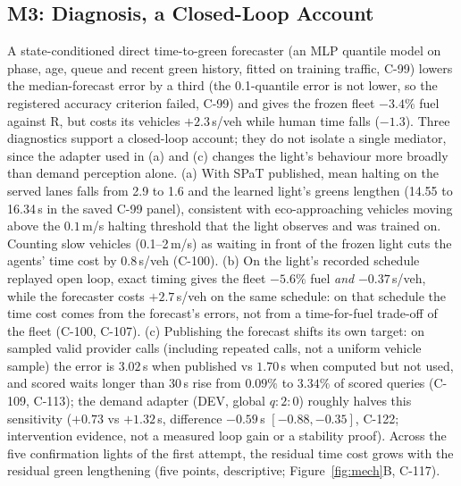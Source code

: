 \subsection{M3: Diagnosis, a Closed-Loop Account}\label{sec:diag}
A state-conditioned direct time-to-green forecaster (an MLP quantile model on phase, age, queue and recent green history, fitted on training
traffic, C-99) lowers the median-forecast error by a third (the 0.1-quantile error is not lower, so the
registered accuracy criterion failed, C-99) and gives the frozen fleet $-3.4\%$ fuel against R, but costs its vehicles
$+2.3$\,s/veh while human time falls ($-1.3$). Three diagnostics support a closed-loop account; they do not isolate a single mediator,
since the adapter used in (a) and (c) changes the light's behaviour more broadly than demand perception alone.
(a) With SPaT published, mean halting on the served lanes falls from 2.9 to 1.6 and the learned light's greens lengthen (14.55 to 16.34\,s in the saved C-99 panel),
consistent with eco-approaching vehicles moving above the $0.1$\,m/s halting threshold that the light observes and was trained on. Counting slow vehicles
(0.1--2\,m/s) as waiting in front of the frozen light cuts the agents' time cost by $0.8$\,s/veh (C-100).
(b) On the light's recorded schedule replayed open loop, exact timing gives the fleet $-5.6\%$ fuel \emph{and} $-0.37$\,s/veh, while the forecaster
costs $+2.7$\,s/veh on the same schedule: on that schedule the time cost comes from the forecast's errors, not from a time-for-fuel
trade-off of the fleet (C-100, C-107).
(c) Publishing the forecast shifts its own target: on sampled valid provider calls (including repeated calls, not a uniform vehicle sample) the error is $3.02$\,s when published vs $1.70$\,s when computed
but not used, and scored waits longer than 30\,s rise from $0.09\%$ to $3.34\%$ of scored queries (C-109, C-113); the demand adapter (DEV, global $q{:}2{:}0$) roughly halves this
sensitivity ($+0.73$ vs $+1.32$\,s, difference $-0.59$\,s $[-0.88,-0.35]$, C-122; intervention evidence, not a measured loop gain or a stability proof). Across the five confirmation lights of the first attempt, the residual time cost grows with the residual green
lengthening (five points, descriptive; Figure~\ref{fig:mech}B, C-117).

